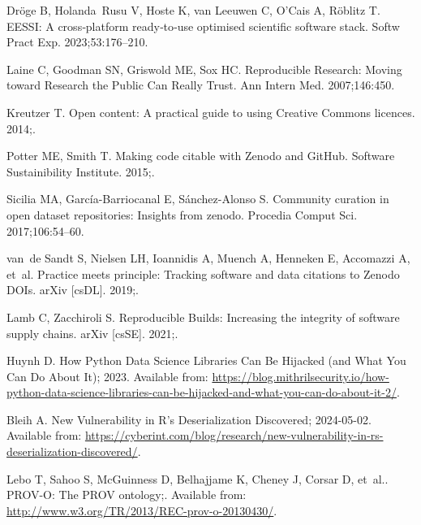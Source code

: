 \documentclass[11pt]{article}
\begin{document}
\begin{thebibliography}{10}
Dröge B, Holanda~Rusu V, Hoste K, van Leeuwen C, O'Cais A, Röblitz T.
\newblock EESSI: A cross‐platform ready‐to‐use optimised scientific
  software stack.
\newblock Softw Pract Exp. 2023;53:176--210.

Laine C, Goodman SN, Griswold ME, Sox HC.
\newblock Reproducible Research: Moving toward Research the Public Can Really
  Trust.
\newblock Ann Intern Med. 2007;146:450.

Kreutzer T.
\newblock Open content: A practical guide to using Creative Commons licences.
  2014;.

Potter ME, Smith T.
\newblock Making code citable with Zenodo and GitHub.
\newblock Software Sustainibility Institute. 2015;.

Sicilia MA, García-Barriocanal E, Sánchez-Alonso S.
\newblock Community curation in open dataset repositories: Insights from
  zenodo.
\newblock Procedia Comput Sci. 2017;106:54--60.

van~de Sandt S, Nielsen LH, Ioannidis A, Muench A, Henneken E, Accomazzi A,
  et~al.
\newblock Practice meets principle: Tracking software and data citations to
  Zenodo DOIs.
\newblock arXiv [csDL]. 2019;.

Lamb C, Zacchiroli S.
\newblock Reproducible Builds: Increasing the integrity of software supply
  chains.
\newblock arXiv [csSE]. 2021;.

Huynh D. How Python Data Science Libraries Can Be Hijacked (and What You Can Do
  About It); 2023.
\newblock Available from:
  \url{https://blog.mithrilsecurity.io/how-python-data-science-libraries-can-be-hijacked-and-what-you-can-do-about-it-2/}.

Bleih A. New Vulnerability in {R}'s Deserialization Discovered; 2024-05-02.
\newblock Available from:
  \url{https://cyberint.com/blog/research/new-vulnerability-in-rs-deserialization-discovered/}.

Lebo T, Sahoo S, McGuinness D, Belhajjame K, Cheney J, Corsar D, et~al..
  PROV-O: The PROV ontology;.
\newblock Available from: \url{http://www.w3.org/TR/2013/REC-prov-o-20130430/}.

\end{thebibliography}
\end{document}

